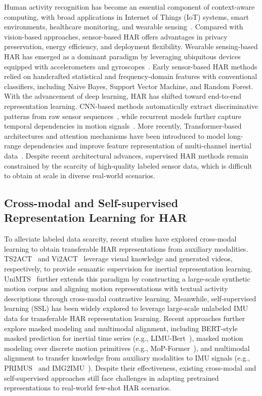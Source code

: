 \documentclass[journal]{IEEEtran}
\begin{document}
Human activity recognition has become an essential component of context-aware computing, with broad applications in Internet of Things (IoT) systems, smart environments, healthcare monitoring, and wearable sensing~\cite{har1}. Compared with vision-based approaches, sensor-based HAR offers advantages in privacy preservation, energy efficiency, and deployment flexibility. Wearable sensing-based HAR has emerged as a dominant paradigm by leveraging ubiquitous devices equipped with accelerometers and gyroscopes~\cite{har3}. Early sensor-based HAR methods relied on handcrafted statistical and frequency-domain features with conventional classifiers, including Naive Bayes, Support Vector Machine, and Random Forest. With the advancement of deep learning, HAR has shifted toward end-to-end representation learning. CNN-based methods automatically extract discriminative patterns from raw sensor sequences~\cite{har5}, while recurrent models further capture temporal dependencies in motion signals~\cite{har6}. More recently, Transformer-based architectures and attention mechanisms have been introduced to model long-range dependencies and improve feature representation of multi-channel inertial data~\cite{har7}. Despite recent architectural advances, supervised HAR methods remain constrained by the scarcity of high-quality labeled sensor data, which is difficult to obtain at scale in diverse real-world scenarios.

\subsection{Cross-modal and Self-supervised Representation Learning for HAR}

To alleviate labeled data scarcity, recent studies have explored cross-modal learning to obtain transferable HAR representations from auxiliary modalities. TS2ACT~\cite{ts2act} and Vi2ACT~\cite{vi2act} leverage visual knowledge and generated videos, respectively, to provide semantic supervision for inertial representation learning. UniMTS~\cite{unimts} further extends this paradigm by constructing a large-scale synthetic motion corpus and aligning motion representations with textual activity descriptions through cross-modal contrastive learning. Meanwhile, self-supervised learning (SSL) has been widely explored to leverage large-scale unlabeled IMU data for transferable HAR representation learning. Recent approaches further explore masked modeling and multimodal alignment, including BERT-style masked prediction for inertial time series (e.g., LIMU-Bert~\cite{limubert}), masked motion modeling over discrete motion primitives (e.g., MoP-Former~\cite{mopformer}), and multimodal alignment to transfer knowledge from auxiliary modalities to IMU signals (e.g., PRIMUS~\cite{primus} and IMG2IMU~\cite{img2imu}). Despite their effectiveness, existing cross-modal and self-supervised approaches still face challenges in adapting pretrained representations to real-world few-shot HAR scenarios.
\end{document}
